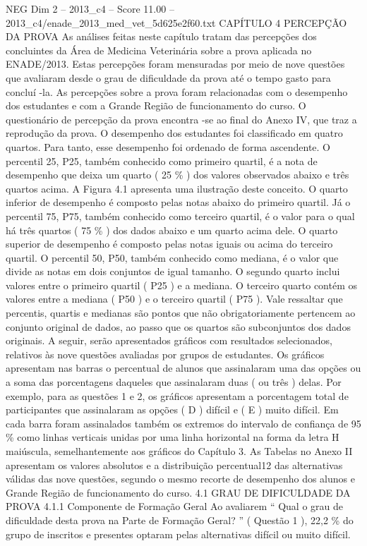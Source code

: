 \begin{textsample}{NEG Dim 2 – 2013\_c4 – Score 11.00 – 2013\_c4/enade\_2013\_med\_vet\_5d625e2f60.txt}  \label{ex:f2_neg_366}
CAPÍTULO 4 PERCEPÇÃO DA PROVA As análises feitas neste capítulo tratam das percepções dos concluintes da Área de Medicina Veterinária sobre a prova aplicada no ENADE/2013.
Estas percepções foram mensuradas por meio de nove questões que avaliaram desde o grau de dificuldade da prova até o tempo gasto para concluí -la.
As percepções sobre a prova foram relacionadas com o desempenho dos estudantes e com a Grande Região de funcionamento do curso.
O questionário de percepção da prova encontra -se ao final do Anexo IV, que traz a reprodução da prova.
O desempenho dos estudantes foi classificado em quatro quartos.
Para tanto, esse desempenho foi ordenado de forma ascendente.
O percentil 25, P25, também conhecido como primeiro quartil, é a nota de desempenho que deixa um quarto ( 25 \% ) dos valores observados abaixo e três quartos acima.
A Figura 4.1 apresenta uma ilustração deste conceito.
O quarto inferior de desempenho é composto pelas notas abaixo do primeiro quartil.
Já o percentil 75, P75, também conhecido como terceiro quartil, é o valor para o qual há três quartos ( 75 \% ) dos dados abaixo e um quarto acima dele.
O quarto superior de desempenho é composto pelas notas iguais ou acima do terceiro quartil.
O percentil 50, P50, também conhecido como mediana, é o valor que divide as notas em dois conjuntos de igual tamanho.
O segundo quarto inclui valores entre o primeiro quartil ( P25 ) e a mediana.
O terceiro quarto contém os valores entre a mediana ( P50 ) e o terceiro quartil ( P75 ).
Vale ressaltar que percentis, quartis e medianas são pontos que não obrigatoriamente pertencem ao conjunto original de dados, ao passo que os quartos são subconjuntos dos dados originais.
A seguir, serão apresentados gráficos com resultados selecionados, relativos às nove questões avaliadas por grupos de estudantes.
Os gráficos apresentam nas barras o percentual de alunos que assinalaram uma das opções ou a soma das porcentagens daqueles que assinalaram duas ( ou três ) delas.
Por exemplo, para as questões 1 e 2, os gráficos apresentam a porcentagem total de participantes que assinalaram as opções ( D ) difícil e ( E ) muito difícil.
Em cada barra foram assinalados também os extremos do intervalo de confiança de 95 \% como linhas verticais unidas por uma linha horizontal na forma da letra H maiúscula, semelhantemente aos gráficos do Capítulo 3.
As Tabelas no Anexo II apresentam os valores absolutos e a distribuição percentual12 das alternativas válidas das nove questões, segundo o mesmo recorte de desempenho dos alunos e Grande Região de funcionamento do curso. 4.1 GRAU DE DIFICULDADE DA PROVA 4.1.1 Componente de Formação Geral Ao avaliarem “ Qual o grau de dificuldade desta prova na Parte de Formação Geral? ” ( Questão 1 ), 22,2 \% do grupo de inscritos e presentes optaram pelas alternativas difícil ou muito difícil.

\end{textsample}
